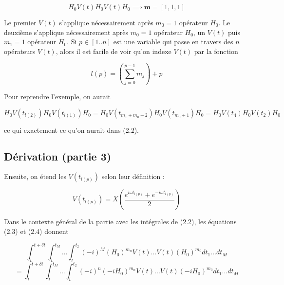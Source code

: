 \begin{equation*}
    H_0V(t)H_0V(t)H_0 \implies \boldsymbol{m} = \left[1, 1, 1\right]
\end{equation*}

Le premier $V(t)$ s'applique nécessairement après $m_0 = 1$ opérateur $H_0$. Le deuxième s'applique nécessairement après $m_0 = 1$ opérateur $H_0$, un $V(t)$ puis $m_1 = 1$ opérateur $H_0$. Si $p \in \left[1..n\right]$ est une variable qui passe en travers des $n$ opérateurs $V(t)$, alors il est facile de voir qu'on indexe $V(t)$ par la fonction 

\begin{equation}
    l(p) = \left(\sum_{j=0}^{p-1}m_j\right) + p
\end{equation}

Pour reprendre l'exemple, on aurait 

\begin{equation*}
    H_0V(t_{l(2)})H_0V(t_{l(1)})H_0 = H_0V(t_{m_1 + m_0 + 2})H_0V(t_{m_0 + 1})H_0 = H_0V(t_4)H_0V(t_2)H_0
\end{equation*}

ce qui exactement ce qu'on aurait dans (2.2).

\subsection{Dérivation (partie 3)}
Ensuite, on étend les $V(t_{l(p)})$ selon leur définition :

\begin{equation*}
    V(t_{l(p)}) = X\left(\frac{e^{i\omega t_{l(p)}} + e^{-i\omega t_{l(p)}}}{2}\right)
\end{equation*}











\newpage
Dans le contexte général de la partie avec les intégrales de (2.2), les équations (2.3) et (2.4) donnent 

\begin{equation*}
    \int_{t}^{t+\delta t}\int_{t}^{t_M}...\int_{t}^{t_2}(-i)^M (H_0)^{m_n}V(t)...V(t)(H_0)^{m_0}dt_1...dt_M
\end{equation*}
\begin{equation}
    = \int_{t}^{t+\delta t}\int_{t}^{t_M}...\int_{t}^{t_2} (-i)^n (-iH_0)^{m_n}V(t)...V(t)(-iH_0)^{m_0}dt_1...dt_M
\end{equation}



